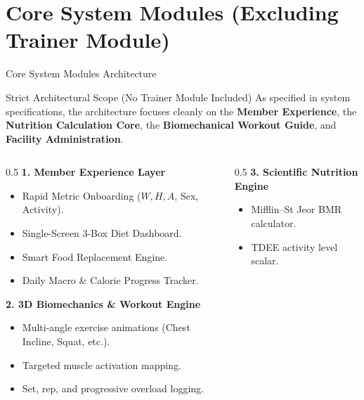 \documentclass[aspectratio=169,10pt]{beamer}
\begin{document}
\section{Core System Modules (Excluding Trainer Module)}

\begin{frame}{Core System Modules Architecture}
  \begin{block}{Strict Architectural Scope (No Trainer Module Included)}
    As specified in system specifications, the architecture focuses cleanly on the \textbf{Member Experience}, the \textbf{Nutrition Calculation Core}, the \textbf{Biomechanical Workout Guide}, and \textbf{Facility Administration}.
  \end{block}
  \begin{columns}[T]
    \begin{column}{0.5\textwidth}
      \textbf{1. Member Experience Layer}
      \begin{itemize}
        \item Rapid Metric Onboarding ($W, H, A$, Sex, Activity).
        \item Single-Screen 3-Box Diet Dashboard.
        \item Smart Food Replacement Engine.
        \item Daily Macro \& Calorie Progress Tracker.
      \end{itemize}
      \vspace{0.2cm}
      \textbf{2. 3D Biomechanics \& Workout Engine}
      \begin{itemize}
        \item Multi-angle exercise animations (Chest Incline, Squat, etc.).
        \item Targeted muscle activation mapping.
        \item Set, rep, and progressive overload logging.
      \end{itemize}
    \end{column}
    \begin{column}{0.5\textwidth}
      \textbf{3. Scientific Nutrition Engine}
      \begin{itemize}
        \item Mifflin--St Jeor BMR calculator.
        \item TDEE activity level scalar.

\end{itemize}
\end{column}
\end{columns}
\end{frame}
\end{document}
